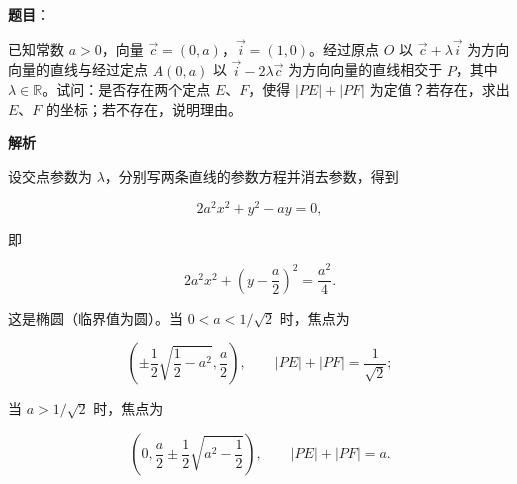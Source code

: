 \begin{answer}

\textbf{题目}：

已知常数 $a>0$，向量 $\vec c=(0,a)$，$\vec i=(1,0)$。经过原点 $O$ 以 $\vec c+\lambda\vec i$ 为方向向量的直线与经过定点 $A(0,a)$ 以 $\vec i-2\lambda\vec c$ 为方向向量的直线相交于 $P$，其中 $\lambda\in\mathbb R$。试问：是否存在两个定点 $E\text{、}F$，使得 $|PE|+|PF|$ 为定值？若存在，求出 $E\text{、}F$ 的坐标；若不存在，说明理由。

\textbf{解析}

设交点参数为 $\lambda$，分别写两条直线的参数方程并消去参数，得到

\nopagebreak[4]
\[
2a^2x^2+y^2-ay=0,
\]

即

\nopagebreak[4]
\[
2a^2x^2+\left(y-\frac a2\right)^2=\frac{a^2}{4}.
\]

这是椭圆（临界值为圆）。当 $0<a<1/\sqrt2$ 时，焦点为

\nopagebreak[4]
\[
\left(\pm\frac12\sqrt{\frac12-a^2},\frac a2\right),
\qquad |PE|+|PF|=\frac1{\sqrt2};
\]

当 $a>1/\sqrt2$ 时，焦点为

\nopagebreak[4]
\[
\left(0,\frac a2\pm\frac12\sqrt{a^2-\frac12}\right),
\qquad |PE|+|PF|=a.
\]


\end{answer}
